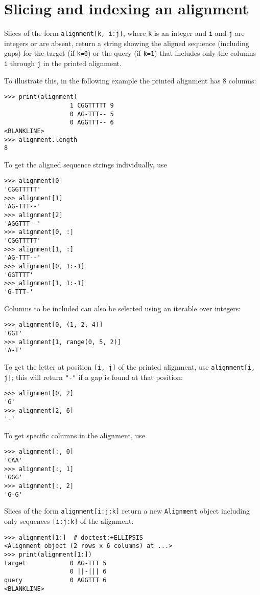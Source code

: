 \section{Slicing and indexing an alignment}

Slices of the form \verb+alignment[k, i:j]+, where \verb+k+ is an integer and \verb+i+ and \verb+j+ are integers or are absent, return a string showing the aligned sequence (including gaps) for the target (if \verb+k=0+) or the query (if \verb+k=1+) that includes only the columns \verb+i+ through \verb+j+ in the printed alignment.

To illustrate this, in the following example the printed alignment has 8 columns:

\begin{verbatim}
>>> print(alignment)
                  1 CGGTTTTT 9
                  0 AG-TTT-- 5
                  0 AGGTTT-- 6
<BLANKLINE>
>>> alignment.length
8
\end{verbatim}

To get the aligned sequence strings individually, use
\begin{verbatim}
>>> alignment[0]
'CGGTTTTT'
>>> alignment[1]
'AG-TTT--'
>>> alignment[2]
'AGGTTT--'
>>> alignment[0, :]
'CGGTTTTT'
>>> alignment[1, :]
'AG-TTT--'
>>> alignment[0, 1:-1]
'GGTTTT'
>>> alignment[1, 1:-1]
'G-TTT-'
\end{verbatim}

Columns to be included can also be selected using an iterable over integers:
\begin{verbatim}
>>> alignment[0, (1, 2, 4)]
'GGT'
>>> alignment[1, range(0, 5, 2)]
'A-T'
\end{verbatim}

To get the letter at position \verb+[i, j]+ of the printed alignment, use \verb|alignment[i, j]|; this will return \verb|"-"| if a gap is found at that position:
\begin{verbatim}
>>> alignment[0, 2]
'G'
>>> alignment[2, 6]
'-'
\end{verbatim}

To get specific columns in the alignment, use
\begin{verbatim}
>>> alignment[:, 0]
'CAA'
>>> alignment[:, 1]
'GGG'
>>> alignment[:, 2]
'G-G'
\end{verbatim}

Slices of the form \verb+alignment[i:j:k]+ return a new \verb+Alignment+ object including only sequences \verb+[i:j:k]+ of the alignment:
\begin{verbatim}
>>> alignment[1:]  # doctest:+ELLIPSIS
<Alignment object (2 rows x 6 columns) at ...>
>>> print(alignment[1:])
target            0 AG-TTT 5
                  0 ||-||| 6
query             0 AGGTTT 6
<BLANKLINE>
\end{verbatim}


